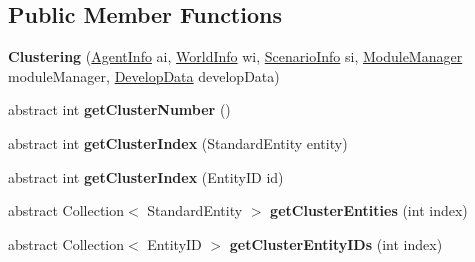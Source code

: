 \subsection*{Public Member Functions}
\begin{DoxyCompactItemize}
\item 
\hypertarget{classadf_1_1component_1_1module_1_1algorithm_1_1Clustering_aa1dcf3e542dafd76e7a60937d5ef1a65}{}\label{classadf_1_1component_1_1module_1_1algorithm_1_1Clustering_aa1dcf3e542dafd76e7a60937d5ef1a65} 
{\bfseries Clustering} (\hyperlink{classadf_1_1agent_1_1info_1_1AgentInfo}{Agent\+Info} ai, \hyperlink{classadf_1_1agent_1_1info_1_1WorldInfo}{World\+Info} wi, \hyperlink{classadf_1_1agent_1_1info_1_1ScenarioInfo}{Scenario\+Info} si, \hyperlink{classadf_1_1agent_1_1module_1_1ModuleManager}{Module\+Manager} module\+Manager, \hyperlink{classadf_1_1agent_1_1develop_1_1DevelopData}{Develop\+Data} develop\+Data)
\item 
\hypertarget{classadf_1_1component_1_1module_1_1algorithm_1_1Clustering_a11645f349c9d8b3b36a5bd0ef32c8759}{}\label{classadf_1_1component_1_1module_1_1algorithm_1_1Clustering_a11645f349c9d8b3b36a5bd0ef32c8759} 
abstract int {\bfseries get\+Cluster\+Number} ()
\item 
\hypertarget{classadf_1_1component_1_1module_1_1algorithm_1_1Clustering_a95e78c67ee2faf449f268d3de54356ed}{}\label{classadf_1_1component_1_1module_1_1algorithm_1_1Clustering_a95e78c67ee2faf449f268d3de54356ed} 
abstract int {\bfseries get\+Cluster\+Index} (Standard\+Entity entity)
\item 
\hypertarget{classadf_1_1component_1_1module_1_1algorithm_1_1Clustering_adf11ac7549acf8c5f6f5b8ce940b7a29}{}\label{classadf_1_1component_1_1module_1_1algorithm_1_1Clustering_adf11ac7549acf8c5f6f5b8ce940b7a29} 
abstract int {\bfseries get\+Cluster\+Index} (Entity\+ID id)
\item 
\hypertarget{classadf_1_1component_1_1module_1_1algorithm_1_1Clustering_a48736807ea1eb28cea5537b9cd92c432}{}\label{classadf_1_1component_1_1module_1_1algorithm_1_1Clustering_a48736807ea1eb28cea5537b9cd92c432} 
abstract Collection$<$ Standard\+Entity $>$ {\bfseries get\+Cluster\+Entities} (int index)
\item 
\hypertarget{classadf_1_1component_1_1module_1_1algorithm_1_1Clustering_a8b93e3382f702875cb9d0380bc5fa082}{}\label{classadf_1_1component_1_1module_1_1algorithm_1_1Clustering_a8b93e3382f702875cb9d0380bc5fa082} 
abstract Collection$<$ Entity\+ID $>$ {\bfseries get\+Cluster\+Entity\+I\+Ds} (int index)
\item 

\end{DoxyCompactItemize}
